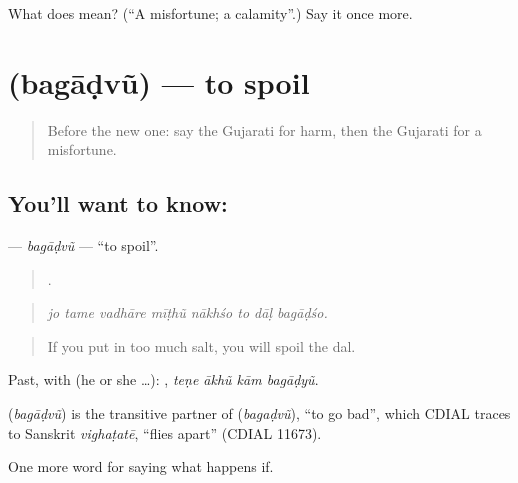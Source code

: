 \begin{tcolorbox}[breakable,colback=teal!4,colframe=teal!35!black,title={Before you move on}]
What does  mean? (\textquotedblleft{}A misfortune; a calamity\textquotedblright{}.) Say it once more.
\end{tcolorbox}
\section[\texorpdfstring{\gu{બગાડવું} (bagāḍvũ)}{બગાડવું (bagāḍvũ)}]{ (bagāḍvũ) — to spoil}

\label{lesson:GU-C370-bagadvu-spoil}



\begin{quote}
Before the new one: say the Gujarati for harm, then the Gujarati for a misfortune.
\end{quote}

\subsection*{You'll want to know: }
\textbf{} — \emph{bagāḍvũ} — \textquotedblleft{}to spoil\textquotedblright{}.

\begin{quote}
       .
\end{quote}

\begin{quote}
\emph{jo tame vadhāre mīṭhũ nākhśo to dāḷ bagāḍśo.}
\end{quote}

\begin{quote}
If you put in too much salt, you will spoil the dal.
\end{quote}

Past, with  (he or she …):    , \emph{teṇe ākhũ kām bagāḍyũ}.

\begin{cousinweb}
\textbf{} (\emph{bagāḍvũ}) is the transitive partner of \textbf{} (\emph{bagaḍvũ}), \textquotedblleft{}to go bad\textquotedblright{}, which CDIAL traces to Sanskrit \emph{vighaṭatē}, \textquotedblleft{}flies apart\textquotedblright{} (CDIAL 11673).
\end{cousinweb}

\begin{grammarlens}[title={What you've built}]
One more word for saying what happens if.
\end{grammarlens}

